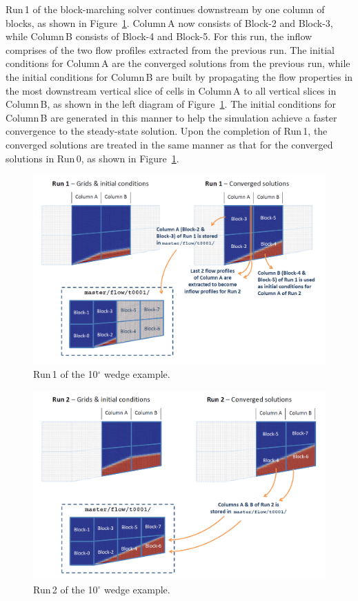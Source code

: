 \documentclass[12pt,a4paper,twoside]{article}
\begin{document}
\medskip
Run\,1 of the block-marching solver continues downstream by one column of blocks, 
as shown in Figure~\ref{f:wedge10-run-1}. Column\,A now consists of Block-2 and 
Block-3, while Column\,B consists of Block-4 and Block-5. For this run, the inflow
comprises of the two flow profiles extracted from the previous run. The initial
conditions for Column\,A are the converged solutions from the previous run, while
the initial conditions for Column\,B are built by propagating the flow properties
in the most downstream vertical slice of cells in Column\,A to all vertical slices
in Column\,B, as shown in the left diagram of Figure~\ref{f:wedge10-run-1}. The 
initial conditions for Column\,B are generated in this manner to help the simulation 
achieve a faster convergence to the steady-state solution. Upon the completion of 
Run\,1, the converged solutions are treated in the same manner as that for the 
converged solutions in Run\,0, as shown in Figure~\ref{f:wedge10-run-1}.
%
\begin{figure}
   \centerline{ \includegraphics[width=16cm]{figs/e3march-run-1.png} }
   \caption{Run\,1 of the 10$^\circ$ wedge example.}
   \label{f:wedge10-run-1}
\end{figure}
%
\begin{figure}
   \centerline{ \includegraphics[width=16cm]{figs/e3march-run-2.png} }
   \caption{Run\,2 of the 10$^\circ$ wedge example.}
   \label{f:wedge10-run-2}
\end{figure}
\end{document}
